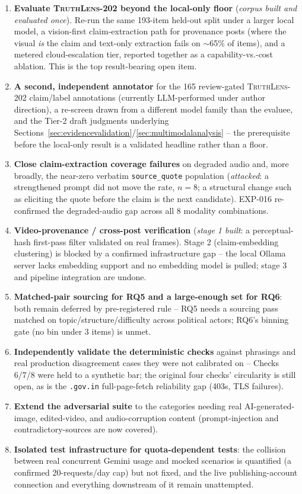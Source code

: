 \documentclass[conference]{IEEEtran}
\begin{document}
\begin{enumerate}
\item \textbf{Evaluate \textsc{TruthLens-202} beyond the local-only floor}
  (\emph{corpus built and evaluated once}). Re-run the same 193-item
  held-out split under a larger local model, a vision-first
  claim-extraction path for provenance posts (where the visual \emph{is}
  the claim and text-only extraction fails on $\sim$65\% of items), and a
  metered cloud-escalation tier, reported together as a
  capability-vs.-cost ablation. This is the top result-bearing open item.
\item \textbf{A second, independent annotator} for the 165 review-gated
  \textsc{TruthLens-202} claim/label annotations (currently
  LLM-performed under author direction), a re-screen drawn from a
  different model family than the evaluee, and the Tier-2 draft
  judgments underlying
  Sections~\ref{sec:evidencevalidation}/\ref{sec:multimodalanalysis} --
  the prerequisite before the local-only result is a validated headline
  rather than a floor.
\item \textbf{Close claim-extraction coverage failures} on degraded
  audio and, more broadly, the near-zero verbatim \texttt{source\_quote}
  population (\emph{attacked}: a strengthened prompt did not move the
  rate, $n=8$; a structural change such as eliciting the quote before the
  claim is the next candidate). EXP-016 re-confirmed the degraded-audio
  gap across all 8 modality combinations.
\item \textbf{Video-provenance / cross-post verification}
  (\emph{stage 1 built}: a perceptual-hash first-pass filter validated on
  real frames). Stage 2 (claim-embedding clustering) is blocked by a
  confirmed infrastructure gap -- the local Ollama server lacks embedding
  support and no embedding model is pulled; stage 3 and pipeline
  integration are undone.
\item \textbf{Matched-pair sourcing for RQ5 and a large-enough set for
  RQ6}: both remain deferred by pre-registered rule -- RQ5 needs a
  sourcing pass matched on topic/structure/difficulty across political
  actors; RQ6's binning gate (no bin under 3 items) is unmet.
\item \textbf{Independently validate the deterministic checks} against
  phrasings and real production disagreement cases they were not
  calibrated on -- Checks 6/7/8 were held to a synthetic bar; the
  original four checks' circularity is still open, as is the
  \texttt{.gov.in} full-page-fetch reliability gap (403s, TLS failures).
\item \textbf{Extend the adversarial suite} to the categories needing
  real AI-generated-image, edited-video, and audio-corruption content
  (prompt-injection and contradictory-sources are now covered).
\item \textbf{Isolated test infrastructure for quota-dependent tests}:
  the collision between real concurrent Gemini usage and mocked scenarios
  is quantified (a confirmed 20-requests/day cap) but not fixed, and the
  live publishing-account connection and everything downstream of it
  remain unattempted.
\end{enumerate}
\end{document}
